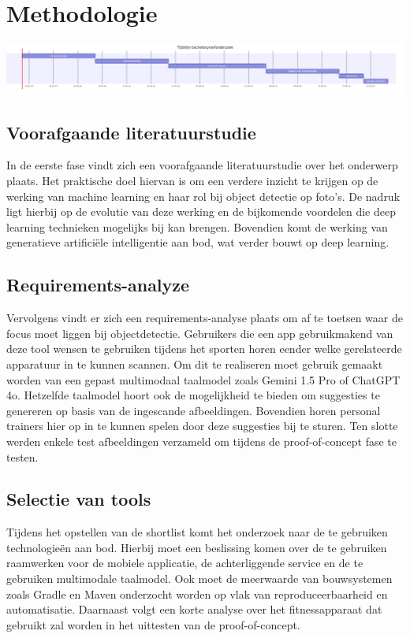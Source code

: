 \section{Methodologie}
\label{sec:methodologie}
\includegraphics[width=1\textwidth]{images/ganttChart}

\subsection{Voorafgaande literatuurstudie}
\label{subsec:literature-study}
In de eerste fase vindt zich een voorafgaande literatuurstudie over het onderwerp plaats. %
Het praktische doel hiervan is om een verdere inzicht te krijgen op de werking van machine learning en haar rol bij object detectie op foto's.
De nadruk ligt hierbij op de evolutie van deze werking en de bijkomende voordelen die deep learning technieken mogelijks bij kan brengen.
Bovendien komt de werking van generatieve artificiële intelligentie aan bod, wat verder bouwt op deep learning.

\subsection{Requirements-analyze}
\label{subsec:dataverzameling}
Vervolgens vindt er zich een requirements-analyse plaats om af te toetsen waar de focus moet liggen bij objectdetectie. %
Gebruikers die een app gebruikmakend van deze tool wensen te gebruiken tijdens het sporten horen eender welke gerelateerde apparatuur in te kunnen scannen.
Om dit te realiseren moet gebruik gemaakt worden van een gepast multimodaal taalmodel zoals Gemini 1.5 Pro of ChatGPT 4o.
Hetzelfde taalmodel hoort ook de mogelijkheid te bieden om suggesties te genereren op basis van de ingescande afbeeldingen.
Bovendien horen personal trainers hier op in te kunnen spelen door deze suggesties bij te sturen.
Ten slotte werden enkele test afbeeldingen verzameld om tijdens de proof-of-concept fase te testen.

\subsection{Selectie van tools}
\label{subsec:selectie-van-tools}
Tijdens het opstellen van de shortlist komt het onderzoek naar de te gebruiken technologieën aan bod.
Hierbij moet een beslissing komen over de te gebruiken raamwerken voor de mobiele applicatie, de achterliggende service en de te gebruiken multimodale taalmodel.
Ook moet de meerwaarde van bouwsystemen zoals Gradle en Maven onderzocht worden op vlak van reproduceerbaarheid en automatisatie.
Daarnaast volgt een korte analyse over het fitnessapparaat dat gebruikt zal worden in het uittesten van de proof-of-concept.

